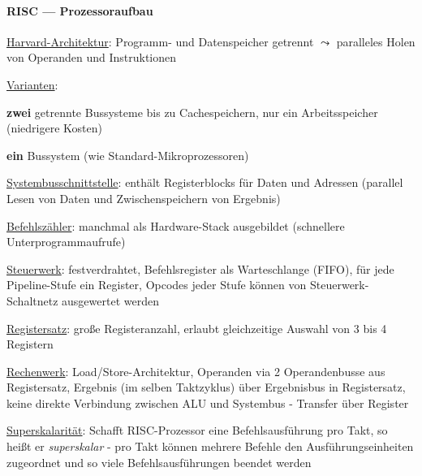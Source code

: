 \paragraph{RISC --- Prozessoraufbau}
\begin{items}
	\item \underline{Harvard-Architektur}: Programm- und Datenspeicher getrennt $\leadsto$ paralleles Holen von Operanden und Instruktionen
	\item \underline{Varianten}:
	\begin{enumeration}
		\item \textbf{zwei} getrennte Bussysteme bis zu Cachespeichern, nur ein Arbeitsspeicher (niedrigere Kosten)
		\item \textbf{ein} Bussystem (wie Standard-Mikroprozessoren)
	\end{enumeration}
	\item \underline{Systembusschnittstelle}: enthält Registerblocks für Daten und Adressen (parallel Lesen von Daten und Zwischenspeichern von Ergebnis)
	\item \underline{Befehlszähler}: manchmal als Hardware-Stack ausgebildet (schnellere Unterprogrammaufrufe)
	\item \underline{Steuerwerk}: festverdrahtet, Befehlsregister als Warteschlange (FIFO), für jede Pipeline-Stufe ein Register, Opcodes jeder Stufe können von Steuerwerk-Schaltnetz ausgewertet werden
	\item \underline{Registersatz}: große Registeranzahl, erlaubt gleichzeitige Auswahl von 3 bis 4 Registern
	\item \underline{Rechenwerk}: Load/Store-Architektur, Operanden via 2 Operandenbusse aus Registersatz, Ergebnis (im selben Taktzyklus) über Ergebnisbus in Registersatz, keine direkte Verbindung zwischen ALU und Systembus - Transfer über Register
	\item \underline{Superskalarität}: Schafft RISC-Prozessor eine Befehlsausführung pro Takt, so heißt er \emph{superskalar} - pro Takt können mehrere Befehle den Ausführungseinheiten zugeordnet und so viele Befehlsausführungen beendet werden
\end{items}